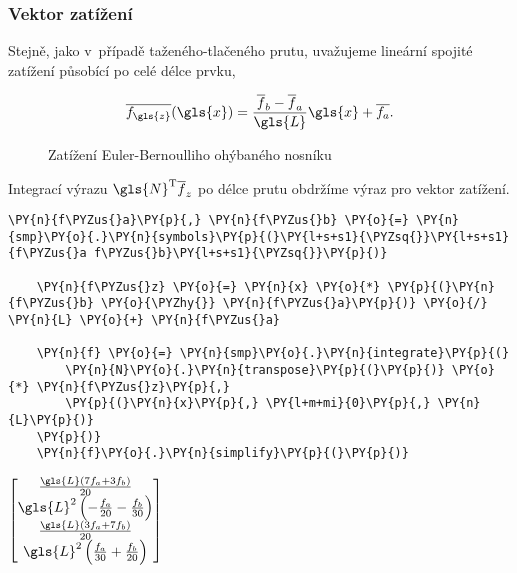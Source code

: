 \subsubsection{Vektor zatížení}

Stejně, jako v~případě taženého-tlačeného prutu, uvažujeme lineární spojité zatížení působící po celé délce prvku,

\begin{equation}
    \overline{f_{\gls{z}}}(\gls{x}) = \frac{\overline{f}_b - \overline{f}_a}{\gls{L}} \gls{x} + \overline{f_a}.
\end{equation}
\begin{figure}[H]
    
    \caption{Zatížení Euler-Bernoulliho ohýbaného nosníku}
    \label{fig:beam_load}
\end{figure}        

Integrací výrazu $\gls{N}^\mathrm{T} \overline{f}_z$ po délce prutu obdržíme výraz pro vektor zatížení.

\begin{tcolorbox}[breakable, size=fbox, boxrule=1pt, pad at break*=1mm,colback=cellbackground, colframe=cellborder]
    \begin{Verbatim}[commandchars=\\\{\}]
    \PY{n}{f\PYZus{}a}\PY{p}{,} \PY{n}{f\PYZus{}b} \PY{o}{=} \PY{n}{smp}\PY{o}{.}\PY{n}{symbols}\PY{p}{(}\PY{l+s+s1}{\PYZsq{}}\PY{l+s+s1}{f\PYZus{}a f\PYZus{}b}\PY{l+s+s1}{\PYZsq{}}\PY{p}{)}
    
    \PY{n}{f\PYZus{}z} \PY{o}{=} \PY{n}{x} \PY{o}{*} \PY{p}{(}\PY{n}{f\PYZus{}b} \PY{o}{\PYZhy{}} \PY{n}{f\PYZus{}a}\PY{p}{)} \PY{o}{/} \PY{n}{L} \PY{o}{+} \PY{n}{f\PYZus{}a}
    
    \PY{n}{f} \PY{o}{=} \PY{n}{smp}\PY{o}{.}\PY{n}{integrate}\PY{p}{(}
        \PY{n}{N}\PY{o}{.}\PY{n}{transpose}\PY{p}{(}\PY{p}{)} \PY{o}{*} \PY{n}{f\PYZus{}z}\PY{p}{,}
        \PY{p}{(}\PY{n}{x}\PY{p}{,} \PY{l+m+mi}{0}\PY{p}{,} \PY{n}{L}\PY{p}{)}
    \PY{p}{)}
    \PY{n}{f}\PY{o}{.}\PY{n}{simplify}\PY{p}{(}\PY{p}{)}
    \end{Verbatim}
\end{tcolorbox}
     
                
        
    $\displaystyle \left[\begin{matrix}\frac{\gls{L} \left(7 f_{a} + 3 f_{b}\right)}{20}\\\gls{L}^{2} \left(- \frac{f_{a}}{20} - \frac{f_{b}}{30}\right)\\\frac{\gls{L} \left(3 f_{a} + 7 f_{b}\right)}{20}\\\gls{L}^{2} \left(\frac{f_{a}}{30} + \frac{f_{b}}{20}\right)\end{matrix}\right]$

